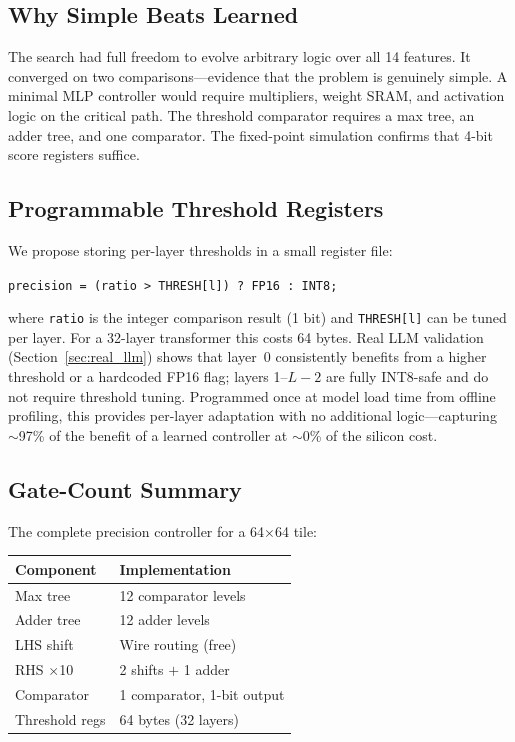 \documentclass[10pt,twocolumn]{article}
\begin{document}
\subsection{Why Simple Beats Learned}

The search had full freedom to evolve arbitrary logic over all 14
features. It converged on two comparisons---evidence that the problem is
genuinely simple. A minimal MLP controller would require multipliers,
weight SRAM, and activation logic on the critical path. The threshold
comparator requires a max tree, an adder tree, and one comparator.
The fixed-point simulation confirms that 4-bit score registers suffice.

\subsection{Programmable Threshold Registers}

We propose storing per-layer thresholds in a small register file:

\smallskip
\noindent\texttt{precision = (ratio > THRESH[l]) ? FP16 : INT8;}
\smallskip

where \texttt{ratio} is the integer comparison result (1 bit) and
\texttt{THRESH[l]} can be tuned per layer. For a 32-layer transformer
this costs 64 bytes. Real LLM validation (Section~\ref{sec:real_llm})
shows that layer~0 consistently benefits from a higher threshold or
a hardcoded FP16 flag; layers 1--$L{-}2$ are fully INT8-safe and do
not require threshold tuning. Programmed once at model load time from
offline profiling, this provides per-layer adaptation with no
additional logic---capturing $\sim$97\% of the benefit of a learned
controller at $\sim$0\% of the silicon cost.

\subsection{Gate-Count Summary}

The complete precision controller for a 64$\times$64 tile:

\begin{center}
\small
\setlength{\tabcolsep}{4pt}
\begin{tabular}{ll}
\toprule
Component & Implementation \\
\midrule
Max tree & 12 comparator levels \\
Adder tree & 12 adder levels \\
LHS shift & Wire routing (free) \\
RHS $\times$10 & 2 shifts $+$ 1 adder \\
Comparator & 1 comparator, 1-bit output \\
Threshold regs & 64 bytes (32 layers) \\
\bottomrule
\end{tabular}
\end{center}
\end{document}

